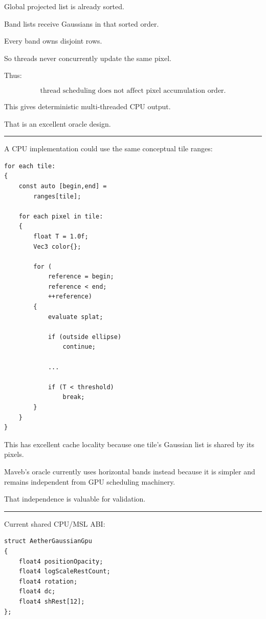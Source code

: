 Global projected list is already sorted.

Band lists receive Gaussians in that sorted order.

Every band owns disjoint rows.

So threads never concurrently update the same pixel.

Thus:

\[
\boxed{
\text{thread scheduling does not affect pixel accumulation order}.
}
\]

This gives deterministic multi-threaded CPU output.

That is an excellent oracle design.

\begin{center}\rule{0.5\linewidth}{0.5pt}\end{center}

A CPU implementation could use the same conceptual tile ranges:

\protect{}\label{tfx8be}%
\begin{verbatim}
for each tile:
{
    const auto [begin,end] =
        ranges[tile];

    for each pixel in tile:
    {
        float T = 1.0f;
        Vec3 color{};

        for (
            reference = begin;
            reference < end;
            ++reference)
        {
            evaluate splat;

            if (outside ellipse)
                continue;

            ...

            if (T < threshold)
                break;
        }
    }
}
\end{verbatim}

This has excellent cache locality because one tile's Gaussian list is shared by its pixels.

Maveb's oracle currently uses horizontal bands instead because it is simpler and remains independent from GPU scheduling machinery.

That independence is valuable for validation.

\begin{center}\rule{0.5\linewidth}{0.5pt}\end{center}

Current shared CPU/MSL ABI:

\protect{}\label{zxyqtm}%
\begin{verbatim}
struct AetherGaussianGpu
{
    float4 positionOpacity;
    float4 logScaleRestCount;
    float4 rotation;
    float4 dc;
    float4 shRest[12];
};
\end{verbatim}

